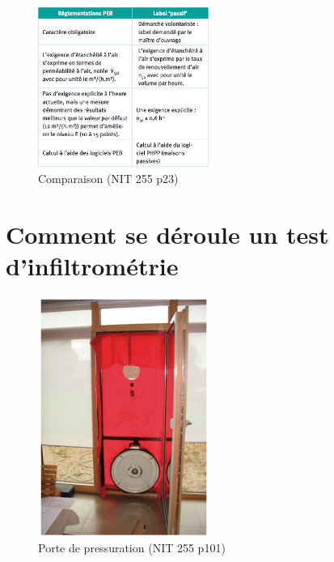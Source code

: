 \begin{figure}[ht]
\centering
\includegraphics[width=0.5\textwidth]{TableauComparatif}
\caption{\label{TableauComparatif} Comparaison (NIT 255 p23)}
\end{figure}


\section{Comment se déroule un test d'infiltrométrie}
\begin{figure}[ht]
\centering
\includegraphics[width=0.5\textwidth]{Blowerdoor}
\caption{\label{Blowerdoor} Porte de pressuration (NIT 255 p101)}
\end{figure}


